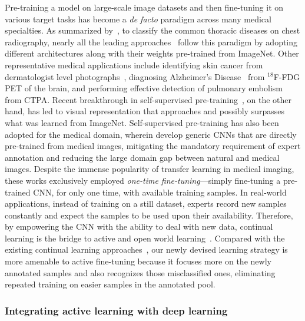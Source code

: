 Pre-training a model on large-scale image datasets and then fine-tuning it on various target tasks has become a \textit{de facto} paradigm across many medical specialties. As summarized by~\citet{irvin2019chexpert}, to classify the common thoracic diseases on chest radiography, nearly all the leading approaches~\citep{guan2018multi,guendel2018learning,tang2018attention,ma2019multi} follow this paradigm by adopting different architectures along with their weights pre-trained from ImageNet. Other representative medical applications include identifying skin cancer from dermatologist level photographs~\citep{esteva2017dermatologist}, diagnosing Alzheimer's Disease~\citep{ding2018deep} from $^{18}$F-FDG PET of the brain, and performing effective detection of pulmonary embolism~\citep{tajbakhsh2019computer} from CTPA. 
Recent breakthrough in self-supervised pre-training~\citep{grill2020bootstrap,caron2020unsupervised,chen2020exploring}, on the other hand, has led to visual representation that approaches and possibly surpasses what was learned from ImageNet. Self-supervised pre-training has also been adopted for the medical domain, wherein \citet{zhou2019models,zhu2020rubik,feng2020parts2whole,haghighi2020learning,azizi2021big} develop generic CNNs that are directly pre-trained from medical images, mitigating the mandatory requirement of expert annotation and reducing the large domain gap between natural and medical images. Despite the immense popularity of transfer learning in medical imaging, these works exclusively employed {\em one-time fine-tuning}---simply fine-tuning a pre-trained CNN,  for only one time, with available training samples. In real-world applications, instead of training on a still dataset, experts record new samples constantly and expect the samples to be used upon their availability. Therefore, by empowering the CNN with the ability to deal with new data, continual learning is the bridge to active and open world learning~\citep{mundt2020wholistic}. Compared with the existing continual learning approaches~\citep{kading2016fine,zhou2017fine}, our newly devised learning strategy is more amenable to active fine-tuning because it focuses more on the newly annotated samples and also recognizes those misclassified ones, eliminating repeated training on easier samples in the annotated pool.


\subsubsection{Integrating active learning with deep learning}
\label{ch1:related_work:acquiring_necessary_annotation:integrating_active_learning_deep_learning}


